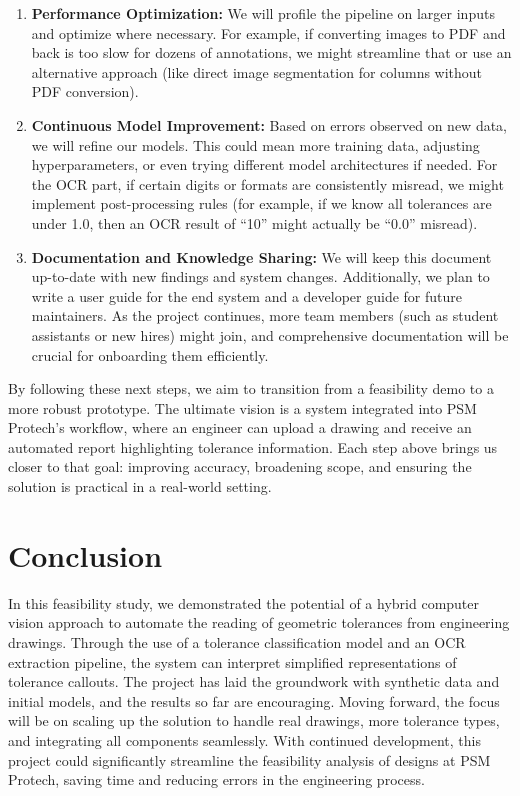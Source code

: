 \documentclass[11pt,a4paper]{article}
\begin{document}
\begin{enumerate}
  \item \textbf{Performance Optimization:} We will profile the pipeline on larger inputs and optimize where necessary. For example, if converting images to PDF and back is too slow for dozens of annotations, we might streamline that or use an alternative approach (like direct image segmentation for columns without PDF conversion).
  \item \textbf{Continuous Model Improvement:} Based on errors observed on new data, we will refine our models. This could mean more training data, adjusting hyperparameters, or even trying different model architectures if needed. For the OCR part, if certain digits or formats are consistently misread, we might implement post-processing rules (for example, if we know all tolerances are under 1.0, then an OCR result of “10” might actually be “0.0” misread).
  \item \textbf{Documentation and Knowledge Sharing:} We will keep this document up-to-date with new findings and system changes. Additionally, we plan to write a user guide for the end system and a developer guide for future maintainers. As the project continues, more team members (such as student assistants or new hires) might join, and comprehensive documentation will be crucial for onboarding them efficiently.
\end{enumerate}

By following these next steps, we aim to transition from a feasibility demo to a more robust prototype. The ultimate vision is a system integrated into PSM Protech’s workflow, where an engineer can upload a drawing and receive an automated report highlighting tolerance information. Each step above brings us closer to that goal: improving accuracy, broadening scope, and ensuring the solution is practical in a real-world setting.

\section{Conclusion}
In this feasibility study, we demonstrated the potential of a hybrid computer vision approach to automate the reading of geometric tolerances from engineering drawings. Through the use of a tolerance classification model and an OCR extraction pipeline, the system can interpret simplified representations of tolerance callouts. The project has laid the groundwork with synthetic data and initial models, and the results so far are encouraging. Moving forward, the focus will be on scaling up the solution to handle real drawings, more tolerance types, and integrating all components seamlessly. With continued development, this project could significantly streamline the feasibility analysis of designs at PSM Protech, saving time and reducing errors in the engineering process.
\end{document}
